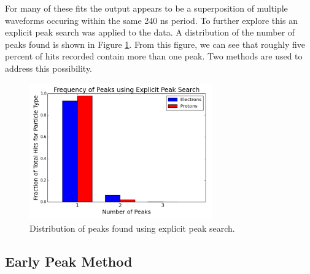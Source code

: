 




For many of these fits the output appears to be a superposition of multiple waveforms occuring within the same 240 ns period. To further explore this an explicit peak search was applied to the data. A distribution of the number of peaks found is shown in Figure \ref{fig:peakSearch}. From this figure, we can see that roughly five percent of hits recorded contain more than one peak. Two methods are used to address this possibility.

\begin{figure}[htp!]
    \centering
    \includegraphics[width=0.7\textwidth]{Images2/peakSearch.png}
    \caption{Distribution of peaks found using explicit peak search.}
    \label{fig:peakSearch}
\end{figure} 


\subsection{Early Peak Method}

